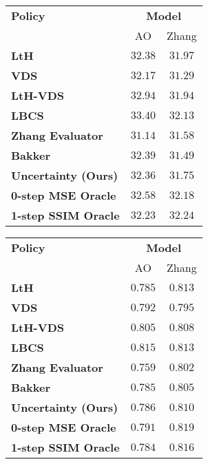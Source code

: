 \begin{figure}[h]
    \begin{minipage}[c]{0.48\textwidth}
    \begin{center}
        \begin{tabular}{lcc}
         \toprule
        \multirow{1}{*}{\textbf{Policy}}& \multicolumn{2}{c}{\textbf{Model}}\\
        \cmidrule{2-3} & AO & Zhang\\
        \midrule
        \textbf{LtH} & $32.38$ & $31.97$\\
        \textbf{VDS} & $32.17$ & $31.29$ \\
        \textbf{LtH-VDS} & $32.94$ & $31.94$ \\
        \textbf{LBCS} & $33.40$& $32.13$\\
        \textbf{Zhang Evaluator} & $31.14$& $31.58$\\
        \textbf{Bakker} & $32.39$& $31.49$ \\
        \textbf{Uncertainty (Ours)} & $32.36$& $31.75$\\
        \midrule
        \textbf{0-step MSE Oracle} & $32.58$ & $32.18$\\
        \textbf{1-step SSIM Oracle} & $32.23$ & $32.24$\\
        \bottomrule
        \end{tabular}
        \label{tab:comp_knee_psnr} 
    \end{center}
    \end{minipage}
    \hfill
    \begin{minipage}[c]{0.48\textwidth}
    \begin{center}
        \begin{tabular}{lcc}
            \toprule
           \multirow{1}{*}{\textbf{Policy}}& \multicolumn{2}{c}{\textbf{Model}}\\
           \cmidrule{2-3} & AO & Zhang\\
           \midrule
           \textbf{LtH}& $0.785$& $0.813$\\
           \textbf{VDS}& $0.792$& $0.795$ \\
           \textbf{LtH-VDS}& $0.805$ & $0.808$ \\
           \textbf{LBCS}& $0.815$& $0.813$\\
           \textbf{Zhang Evaluator}& $0.759$& $0.802$\\
           \textbf{Bakker}& $0.785$& $0.805$ \\
           \textbf{Uncertainty (Ours)} & $0.786$& $0.810$\\
           \midrule
           \textbf{0-step MSE Oracle} & $0.791$ & $0.819$\\
           \textbf{1-step SSIM Oracle} & $0.784$ & $0.816$\\
           \bottomrule
           \end{tabular}
           \label{tab:comp_knee_ssim} 
    \end{center}
    \end{minipage}
    \end{figure}
